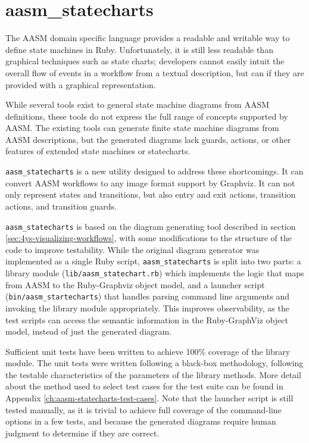 \documentclass[document.tex]{subfiles}
\begin{document}
\FloatBarrier


\section {aasm\_statecharts}

The AASM domain specific language provides a readable and writable way to define state machines in Ruby. Unfortunately, it is still less readable than graphical techniques such as state charts; developers cannot easily intuit the overall flow of events in a workflow from a textual description, but can if they are provided with a graphical representation.

While several tools exist to general state machine diagrams from AASM definitions, these tools do not express the full range of concepts supported by AASM. The existing tools can generate finite state machine diagrams from AASM descriptions, but the generated diagrams lack guards, actions, or other features of extended state machines or statecharts.

\verb!aasm_statecharts! \cite{aasm_statecharts} is a new utility designed to address these shortcomings. It can convert AASM workflows to any image format support by Graphviz. It can not only represent states and transitions, but also entry and exit actions, transition actions, and transition guards.

\verb!aasm_statecharts! is based on the diagram generating tool described in section \ref{sec:4ys-visualizing-workflows}, with some modifications to the structure of the code to improve testability. While the original diagram generator was implemented as a single Ruby script, \verb!aasm_statecharts! is split into two parts: a library module (\verb!lib/aasm_statechart.rb!) which implements the logic that maps from AASM to the Ruby-Graphviz object model, and a launcher script (\verb!bin/aasm_startecharts!) that handles parsing command line arguments and invoking the library module appropriately. This improves observability, as the test scripts can access the semantic information in the Ruby-GraphViz object model, instead of just the generated diagram.

Sufficient unit tests have been written to achieve 100\% coverage of the library module. The unit tests were written following a black-box methodology, following the testable characteristics of the parameters of the library methods.
More detail about the method used to select test cases for the test suite can be found in Appendix \ref{ch:aasm-statecharts-test-cases}.
Note that the launcher script is still tested manually, as it is trivial to achieve full coverage of the command-line options in a few tests, and because the generated diagrams require human judgment to determine if they are correct.
\end{document}
